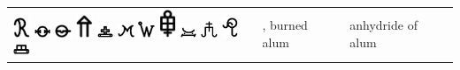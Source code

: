 \documentclass[british,final,landscape]{scrartcl}
\begin{document}
\begin{refsection}
\begin{supertabular}{p{0.3\textwidth}p{0.34\textwidth}p{0.34\textwidth}}
   \includegraphics[width=5mm]{Compounds/BurnedAlum} \includegraphics[width=5mm]{Compounds/BurnedAlum2} \includegraphics[width=5mm]{Compounds/BurnedAlum3} \includegraphics[width=5mm]{Compounds/BurnedAlum4} \includegraphics[width=5mm]{Compounds/BurnedAlum5} \includegraphics[width=5mm]{Compounds/BurnedAlum6} \includegraphics[width=5mm]{Compounds/BurnedAlum7} \includegraphics[width=5mm]{Compounds/BurnedAlum8} \includegraphics[width=5mm]{Compounds/BurnedAlum9} \includegraphics[width=5mm]{Compounds/BurnedAlum10} \includegraphics[width=5mm]{Compounds/BurnedAlum11} \includegraphics[width=5mm]{Compounds/BurnedAlum12} & , burned alum & anhydride of alum \\

\end{supertabular}
\end{refsection}
\end{document}

